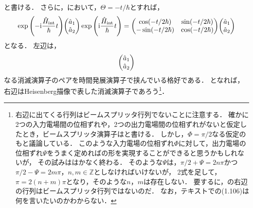 \documentclass{report}
\begin{document}
    と書ける．
    さらに，において，$\Theta = -t / \hbar$とすれば，
    \begin{align}
      \exp\qty(-\i\frac{\hat{H}_{\r{int}}}{\hbar}t)\mqty(\hat{a}_1 \\ \hat{a}_2)\exp\qty(\i\frac{\hat{H}_{\r{int}}}{\hbar}t) = \mqty(
        \cos(-t / 2\hbar) & \sin(-t / 2\hbar) \\ 
        -\sin(-t / 2\hbar) & \cos(-t / 2\hbar)
      )\mqty(\hat{a}_1 \\ \hat{a}_2)
    \end{align}
    となる．
    左辺は，
    \begin{align}
      \mqty(\hat{a}_1 \\ \hat{a}_2)
    \end{align}
    なる消滅演算子のペアを時間発展演算子で挟んでいる格好である．
    となれば，右辺はHeisenberg描像で表した消滅演算子であろう\footnote{
      右辺に出てくる行列はビームスプリッタ行列でないことに注意する．
      確かに2つの入力電場間の位相ずれや，2つの出力電場間の位相ずれがないと仮定したとき，ビームスプリッタ演算子はと書ける．
      しかし，$\Phi = \pi / 2$なる仮定のもと議論している．
      このような入力電場の位相ずれ$\Phi$に対して，出力電場の位相ずれ$\Psi$をうまく定めればの形を実現することができると思うかもしれないが，
      その試みははかなく終わる．
      そのような$\Psi$は，$\pi / 2 + \Psi = 2n\pi$かつ$\pi / 2 - \Psi = 2m\pi$，$n, m \in \mathbb{Z}$としなければいけないが，
      2式を足して，$\pi = 2(n + m)\pi$となり，そのような$n$，$m$は存在しない．
      要するに，の右辺の行列はビームスプリッタ行列ではないのだ．
      なお，テキストでの(1.106)は何を言いたいのかわからない．
      }．
\end{document}
